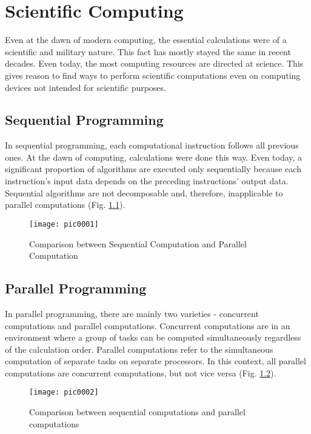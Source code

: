 \newpage
\chapter{Scientific Computing}
\label{chapter01}

Even at the dawn of modern computing, the essential calculations were of a scientific and military nature. This fact has mostly stayed the same in recent decades. Even today, the most computing resources are directed at science. This gives reason to find ways to perform scientific computations even on computing devices not intended for scientific purposes.

\section{Sequential Programming}

In sequential programming, each computational instruction follows all previous ones. At the dawn of computing, calculations were done this way. Even today, a significant proportion of algorithms are executed only sequentially because each instruction's input data depends on the preceding instructions' output data. Sequential algorithms are not decomposable and, therefore, inapplicable to parallel computations (Fig. \ref{fig:pic0001}).

\begin{figure}[h]
\centering
\texttt{[image: pic0001]}
\caption{Comparison between Sequential Computation and Parallel Computation}
\label{fig:pic0001}
\end{figure}

\section{Parallel Programming}

In parallel programming, there are mainly two varieties - concurrent computations and parallel computations. Concurrent computations are in an environment where a group of tasks can be computed simultaneously regardless of the calculation order. Parallel computations refer to the simultaneous computation of separate tasks on separate processors. In this context, all parallel computations are concurrent computations, but not vice versa (Fig. \ref{fig:pic0002}).

\begin{figure}[h]
\centering
\texttt{[image: pic0002]}
\caption{Comparison between sequential computations and parallel computations}
\label{fig:pic0002}
\end{figure}

